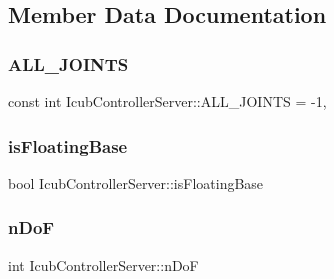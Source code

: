 \subsection{Member Data Documentation}
\hypertarget{classIcubControllerServer_aa977ca558c184e4331121522cc58d2e7}{}\label{classIcubControllerServer_aa977ca558c184e4331121522cc58d2e7} 
\subsubsection{\texorpdfstring{A\+L\+L\+\_\+\+J\+O\+I\+N\+TS}{ALL\_JOINTS}}
{\footnotesize\ttfamily const int Icub\+Controller\+Server\+::\+A\+L\+L\+\_\+\+J\+O\+I\+N\+TS = -\/1\hspace{0.3cm}{\ttfamily [static]}, {\ttfamily [private]}}

\hypertarget{classIcubControllerServer_aebc2019921c3eabb53c01012fbd2355a}{}\label{classIcubControllerServer_aebc2019921c3eabb53c01012fbd2355a} 
\subsubsection{\texorpdfstring{is\+Floating\+Base}{isFloatingBase}}
{\footnotesize\ttfamily bool Icub\+Controller\+Server\+::is\+Floating\+Base\hspace{0.3cm}{\ttfamily [private]}}

\hypertarget{classIcubControllerServer_ab5fb1f18775cfe3036894c73dc21ebcf}{}\label{classIcubControllerServer_ab5fb1f18775cfe3036894c73dc21ebcf} 
\subsubsection{\texorpdfstring{n\+DoF}{nDoF}}
{\footnotesize\ttfamily int Icub\+Controller\+Server\+::n\+DoF\hspace{0.3cm}{\ttfamily [private]}}

\hypertarget{classIcubControllerServer_ad0484106ab9d7fd42e2bd682338871c7}{}\label{classIcubControllerServer_ad0484106ab9d7fd42e2bd682338871c7} 
